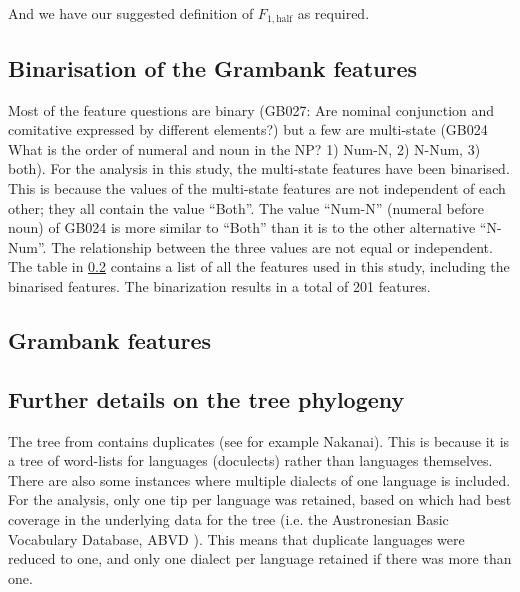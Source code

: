 \documentclass[a4paper,10pt]{article} %
\begin{document}
\noindent And we have our suggested definition of $F_{1,\text{half}}$ as required.

\subsection{Binarisation of the Grambank features}
\label{supp:dataset_details}
Most of the feature questions are binary (GB027: Are nominal conjunction and comitative expressed by different elements?) but a few are multi-state (GB024 What is the order of numeral and noun in the NP? 1) Num-N, 2) N-Num, 3) both). For the analysis in this study, the multi-state features have been binarised. This is because the values of the multi-state features are not independent of each other; they all contain the value ``Both''. The value ``Num-N'' (numeral before noun) of GB024 is more similar to ``Both'' than it is to the other alternative ``N-Num''. The relationship between the three values are not equal or independent. The table in \ref{Grambank_features} contains a list of all the features used in this study, including the binarised features. The binarization results in a total of 201 features. 

\newpage
\subsection{Grambank features}
\label{Grambank_features}

\singlespacing
\begin{landscape}

\end{landscape}
\newpage


\subsection{Further details on the tree phylogeny}
\label{supp:tree_details}

The tree from \citet{grayetal_2009} contains duplicates (see for example Nakanai). This is because it is a tree of word-lists for languages (doculects) rather than languages themselves. There are also some instances where multiple dialects of one language is included. For the analysis, only one tip per language was retained, based on which had best coverage in the underlying data for the tree (i.e. the Austronesian Basic Vocabulary Database, ABVD \citep{ABVD}). This means that duplicate languages were reduced to one, and only one dialect per language retained if there was more than one. 
\end{document}
